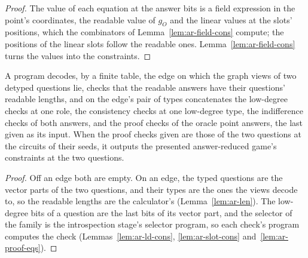 \begin{proof}
\leanok
The value of each equation at the answer bits is a field expression in the point's coordinates,
the readable value of $g_O$ and the linear values at the slots' positions, which the combinators
of Lemma~\ref{lem:ar-field-cons} compute; the positions of the linear slots follow the readable
ones. Lemma~\ref{lem:ar-field-cons} turns the values into the constraints.
\end{proof}

\begin{lemma}
\label{lem:ar-lp-final}
\leanok
A program decodes, by a finite table, the edge on which the graph views of two detyped
questions lie, checks that the readable answers have their questions' readable lengths, and on
the edge's pair of types concatenates the low-degree checks at one role, the consistency checks
at one low-degree type, the indifference checks of both answers, and the proof checks of the
oracle point answers, the last given as its input. When the proof checks given are those of the
two questions at the circuits of their seeds, it outputs the presented answer-reduced game's
constraints at the two questions.
\end{lemma}

\begin{proof}
\leanok
Off an edge both are empty. On an edge, the typed questions are the vector parts of the two
questions, and their types are the ones the views decode to, so the readable lengths are the
calculator's (Lemma~\ref{lem:ar-len}). The low-degree bits of a question are the last bits of
its vector part, and the selector of the family is the introspection stage's selector program,
so each check's program computes the check (Lemmas~\ref{lem:ar-ld-cons}, \ref{lem:ar-slot-cons}
and~\ref{lem:ar-proof-eqs}).
\end{proof}


